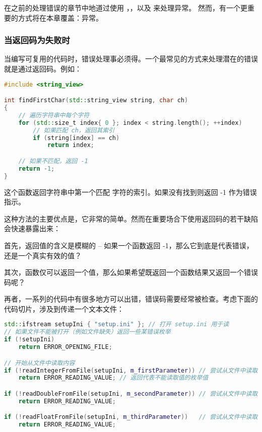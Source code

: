 \documentclass[../../LearnCpp.tex]{subfiles}
\begin{document}

在之前的处理错误的章节中地道过使用 ，，以及  来处理异常。
然而，有一个更重要的方式将在本章覆盖：异常。

\subsubsection*{当返回码为失败时}

当编写可复用的代码时，错误处理事必须得。一个最常见的方式来处理潜在的错误就是通过返回码。例如：

\begin{lstlisting}[language=C++]
#include <string_view>

int findFirstChar(std::string_view string, char ch)
{
    // 遍历字符串中每个字符
    for (std::size_t index{ 0 }; index < string.length(); ++index)
        // 如果匹配 ch，返回其索引
        if (string[index] == ch)
            return index;

    // 如果不匹配，返回 -1
    return -1;
}
\end{lstlisting}

这个函数返回字符串中第一个匹配  字符的索引。如果没有找到则返回 -1 作为错误指示。

这种方法的主要优点是，它非常的简单。然而在重要场合下使用返回码的若干缺陷会快速暴露出来：

首先，返回值的含义是模糊的 -- 如果一个函数返回 -1，那么它到底是代表错误，还是一个真实有效的值？

其次，函数仅可以返回一个值，那么如果希望既返回一个函数结果又返回一个错误码呢？

再者，一系列的代码中有很多地方可以出错，错误码需要经常被检查。考虑下面的代码切片，涉及到传递一个文本文件：

\begin{lstlisting}[language=C++]
std::ifstream setupIni { "setup.ini" }; // 打开 setup.ini 用于读
// 如果文件不能被打开（例如文件缺失）返回一些某错误枚举
if (!setupIni)
    return ERROR_OPENING_FILE;

// 开始从文件中读取内容
if (!readIntegerFromFile(setupIni, m_firstParameter)) // 尝试从文件中读取整型值
    return ERROR_READING_VALUE; // 返回代表不能读取值的枚举值

if (!readDoubleFromFile(setupIni, m_secondParameter)) // 尝试从文件中读取双精度值
    return ERROR_READING_VALUE;

if (!readFloatFromFile(setupIni, m_thirdParameter))   // 尝试从文件中读取浮点值
    return ERROR_READING_VALUE;
\end{lstlisting}
\end{document}
